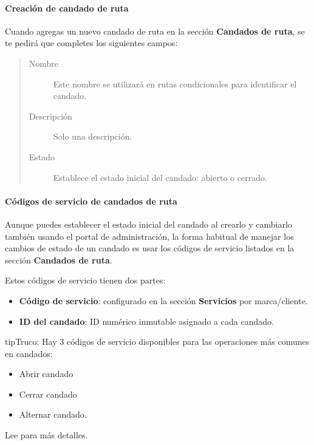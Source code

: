 \documentclass[letterpaper,10pt,spanish]{sphinxmanual}
\begin{document}
\paragraph{Creación de candado de ruta}
\label{administration_portal/client/vpbx/routing_tools/route_locks:route-lock-creation}
Cuando agregas un nuevo candado de ruta en la sección \textbf{Candados de ruta}, se te pedirá que completes los siguientes campos:
\begin{quote}
\begin{description}
\item[{Nombre}] \leavevmode
Este nombre se utilizará en rutas condicionales para identificar el candado.

\item[{Descripción}] \leavevmode
Solo una descripción.

\item[{Estado}] \leavevmode
Establece el estado inicial del candado: abierto o cerrado.

\end{description}
\end{quote}


\paragraph{Códigos de servicio de candados de ruta}
\label{administration_portal/client/vpbx/routing_tools/route_locks:route-locks-service-codes}
Aunque puedes establecer el estado inicial del candado al crearlo y cambiarlo también usando el portal de administración, la forma habitual de manejar los cambios de estado de un candado es usar los códigos de servicio listados en la sección \textbf{Candados de ruta}.

Estos códigos de servicio tienen dos partes:
\begin{itemize}
\item {} 
\textbf{Código de servicio}: configurado en la sección \textbf{Servicios} por marca/cliente.

\item {} 
\textbf{ID del candado}: ID numérico inmutable asignado a cada candado.

\end{itemize}

\begin{notice}{tip}{Truco:}
Hay 3 códigos de servicio disponibles para las operaciones más comunes en candados:
\begin{itemize}
\item {} 
Abrir candado

\item {} 
Cerrar candado

\item {} 
Alternar candado.

\end{itemize}

Lee {\hyperref[administration_portal/client/vpbx/services:services]{}} para más detalles.
\end{notice}
\end{document}
